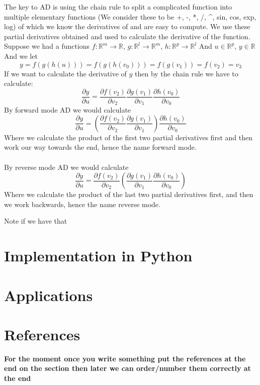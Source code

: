 \documentclass{article}
\begin{document}
The key to AD is using the chain rule to split a complicated function into multiple elementary functions (We consider these to be +, -, *, /, \textasciicircum, sin, cos, exp, log) of which we know the derivatives of and are easy to compute. We use these partial derivatives obtained and used to calculate the derivative of the function.
Suppose we had a functions $f:\mathbb{R}^m \rightarrow \mathbb{R}$, $g:\mathbb{R}^l \rightarrow \mathbb{R}^m$, $h:\mathbb{R}^p \rightarrow \mathbb{R}^l$ And $u \in \mathbb{R}^p$, $y \in \mathbb{R}$ And we let
\begin{equation}
    y = f(g(h(u))) = f(g(h(v_0))) = f(g(v_1)) = f(v_2) = v_3
\end{equation}
If we want to calculate the derivative of $y$ then by the chain rule we have to calculate:
\begin{equation}
    \frac{\partial{y}}{\partial{u}} = \frac{\partial{f(v_2)}}{\partial{v_2}}\frac{\partial{g(v_1)}}{\partial{v_1}}\frac{\partial{h(v_0)}}{\partial{v_0}}
\end{equation}
By forward mode AD we would calculate
\begin{equation}
    \frac{\partial{y}}{\partial{u}} = \left(\frac{\partial{f(v_2)}}{\partial{v_2}}\frac{\partial{g(v_1)}}{\partial{v_1}}\right)\frac{\partial{h(v_0)}}{\partial{v_0}}
\end{equation}
Where we calculate the product of the first two partial derivatives first and then work our way towards the end, hence the name forward mode.
\\\\
By reverse mode AD we would calculate
\begin{equation}
    \frac{\partial{y}}{\partial{u}} = \frac{\partial{f(v_2)}}{\partial{v_2}}\left(\frac{\partial{g(v_1)}}{\partial{v_1}}\frac{\partial{h(v_0)}}{\partial{v_0}}\right)
\end{equation}
Where we calculate the product of the last two partial derivatives first, and then we work backwards, hence the name reverse mode.

Note if we have that



\section{Implementation in Python}

\section{Applications}

\section{References}
\textbf{For the moment once you write something put the references at the end on the section then later we can order/number them correctly at the end}
\end{document}
